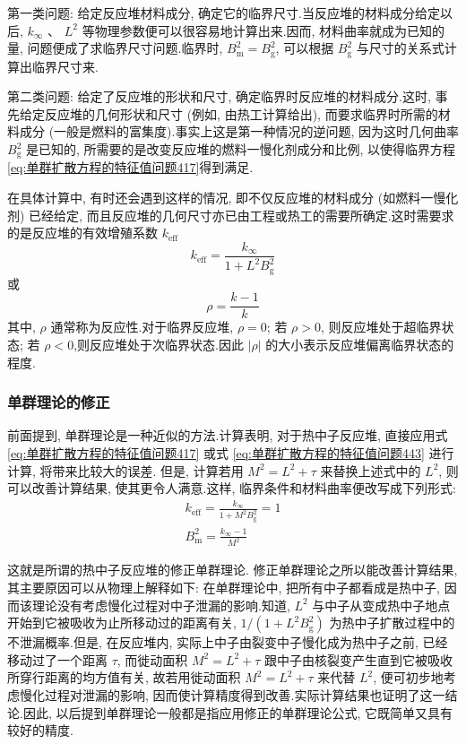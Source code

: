 \documentclass{Sichuan Normal University}
\begin{document}
第一类问题: 给定反应堆材料成分, 确定它的临界尺寸.当反应堆的材料成分给定以后, $k_{\infty}$ 、 $L^2$ 等物理参数便可以很容易地计算出来.因而, 材料曲率就成为已知的量, 问题便成了求临界尺寸问题.临界时, $B_{\mathrm{m}}^2=B_{\mathrm{g}}^2$, 可以根据 $B_{\mathrm{g}}^2$ 与尺寸的关系式计算出临界尺寸来.

第二类问题: 给定了反应堆的形状和尺寸, 确定临界时反应堆的材料成分.这时, 事先给定反应堆的几何形状和尺寸 (例如, 由热工计算给出), 而要求临界时所需的材料成分 (一般是燃料的富集度).事实上这是第一种情况的逆问题, 因为这时几何曲率 $B_{\mathrm{g}}^2$ 是已知的, 所需要的是改变反应堆的燃料一慢化剂成分和比例, 以使得临界方程 \eqref{eq:单群扩散方程的特征值问题417}得到满足.

在具体计算中, 有时还会遇到这样的情况, 即不仅反应堆的材料成分 (如燃料一慢化剂) 已经给定, 而且反应堆的几何尺寸亦已由工程或热工的需要所确定.这时需要求的是反应堆的有效增殖系数 $k_{\mathrm{eff}}$
\begin{equation}
k_{\mathrm{eff}}=\frac{k_{\infty}}{1+L^2 B_{\mathrm{g}}^2}
\end{equation}
或
\begin{equation}
\rho=\frac{k-1}{k}
\end{equation}
其中, $\rho$ 通常称为反应性.对于临界反应堆, $\rho=0$; 若 $\rho>0$, 则反应堆处于超临界状态; 若 $\rho<0$,则反应堆处于次临界状态.因此 $|\rho|$ 的大小表示反应堆偏离临界状态的程度.
\subsubsection{单群理论的修正}
前面提到, 单群理论是一种近似的方法.计算表明, 对于热中子反应堆, 直接应用式 \eqref{eq:单群扩散方程的特征值问题417} 或式 \eqref{eq:单群扩散方程的特征值问题443} 进行计算, 将带来比较大的误差.
但是, 计算若用 $M^2=L^2+\tau$ 来替换上述式中的 $L^2$, 则可以改善计算结果, 使其更令人满意.这样, 临界条件和材料曲率便改写成下列形式:
\begin{equation}
\begin{gathered}
k_{\mathrm{eff}}=\frac{k_{\infty}}{1+M^2 B_{\mathrm{g}}^2}=1 \\
B_{\mathrm{m}}^2=\frac{k_{\infty}-1}{M^2}
\end{gathered}
\end{equation}

这就是所谓的热中子反应堆的修正单群理论.
修正单群理论之所以能改善计算结果, 其主要原因可以从物理上解释如下: 在单群理论中, 把所有中子都看成是热中子, 因而该理论没有考虑慢化过程对中子泄漏的影响.知道, $L^2$ 与中子从变成热中子地点开始到它被吸收为止所移动过的距离有关, $1 /\left(1+L^2 B_{\mathrm{g}}^2\right)$ 为热中子扩散过程中的不泄漏概率.但是, 在反应堆内, 实际上中子由裂变中子慢化成为热中子之前, 已经移动过了一个距离 $\tau$, 而徙动面积 $M^2=L^2+\tau$ 跟中子由核裂变产生直到它被吸收所穿行距离的均方值有关, 故若用徙动面积 $M^2=L^2+\tau$ 来代替 $L^2$, 便可初步地考虑慢化过程对泄漏的影响, 因而使计算精度得到改善.实际计算结果也证明了这一结论.因此, 以后提到单群理论一般都是指应用修正的单群理论公式, 它既简单又具有较好的精度.
\end{document}
